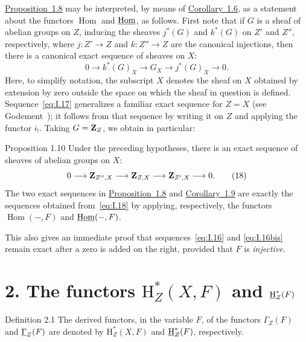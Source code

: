 \hyperref[I.1.8]{Proposition~1.8} may be interpreted, by means of \hyperref[I.1.6]{Corollary~1.6}, as a
statement about the functors $\operatorname{Hom}$ and $\mathop{\underline{\mathrm{Hom}}}\nolimits$, as
follows.  First note that if $G$ is a sheaf of abelian groups on $Z$,
inducing the sheaves $j^*(G)$ and $k^*(G)$ on $Z'$ and $Z''$,
respectively, where $j:Z'\to Z$ and $k:Z''\to Z$ are the canonical
injections, then there is a canonical exact sequence of sheaves on $X$:
\begin{equation}
  0\longrightarrow k^*(G)_X
  \longrightarrow G_X
  \longrightarrow j^*(G)_X
  \longrightarrow 0.
  \tag{17}\label{eq:I.17}
\end{equation}
Here, to simplify notation, the subscript $X$ denotes the sheaf on $X$
obtained by extension by zero outside the space on which the sheaf in
question is defined.  Sequence~\eqref{eq:I.17} generalizes a familiar
exact sequence for $Z=X$ (see Godement~\cite{Godement}); it follows from
that sequence by writing it on $Z$ and applying the functor $i_!$.
Taking $G=\mathbf Z_Z$, we obtain in particular:

\begin{sgastatement}{Proposition 1.10}
Under the preceding hypotheses, there is an exact sequence of sheaves of
abelian groups on $X$:
\begin{equation}
  0\longrightarrow\mathbf Z_{Z'',X}
  \longrightarrow\mathbf Z_{Z,X}
  \longrightarrow\mathbf Z_{Z',X}
  \longrightarrow 0.
  \tag{18}\label{eq:I.18}
\end{equation}
The two exact sequences in \hyperref[I.1.8]{Proposition~1.8} and \hyperref[I.1.9]{Corollary~1.9} are exactly
the sequences obtained from~\eqref{eq:I.18} by applying, respectively,
the functors $\operatorname{Hom}(-,F)$ and $\mathop{\underline{\mathrm{Hom}}}\nolimits(-,F)$.
\end{sgastatement}

This also gives an immediate proof that sequences~\eqref{eq:I.16} and
\eqref{eq:I.16bis} remain exact after a zero is added on the right,
provided that $F$ is \emph{injective}.
\section*{2. The functors $\mathrm H_Z^*(X,F)$ and $\mathop{\underline{\mathrm H}}\nolimits_Z^*(F)$}

\begin{sgastatement}{Definition 2.1}
The derived functors, in the variable $F$, of the functors $\Gamma_Z(F)$
and $\mathop{\underline{\Gamma}}\nolimits_Z(F)$ are denoted by $\mathrm H_Z^*(X,F)$ and $\mathop{\underline{\mathrm H}}\nolimits_Z^*(F)$,
respectively.
\end{sgastatement}

